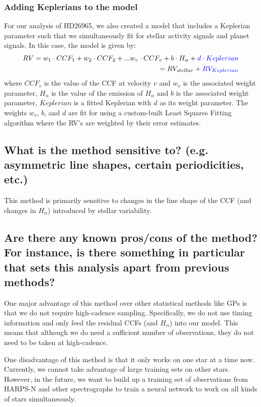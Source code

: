 \documentclass[12pt]{article}
\begin{document}
\subsubsection{Adding Keplerians to the model}
For our analysis of HD26965, we also created a model that includes a Keplerian parameter such that we simultaneously fit for stellar activity signals and planet signals. In this case, the model is given by:
\begin{equation}
\begin{split}
    RV = w_1\cdot CCF_1 +  w_2\cdot CCF_2 + ...  w_v\cdot CCF_v  + b\cdot H_{\alpha} + \textcolor{blue}{d\cdot Keplerian} \\
= RV_{stellar} + \textcolor{blue}{RV_{Keplerian}}
\end{split}
\end{equation}
where $CCF_v$ is the value of the CCF at velocity $v$ and $w_v$ is the associated weight parameter, $H_{\alpha}$ is the value of the emission of $H_{\alpha}$ and $b$ is the associated weight parameter, $Keplerian$ is a fitted Keplerian with $d$ as its weight parameter. The weights $w_v$, $b$, and $d$ are fit for using a custom-built Least Squares Fitting algorithm where the RV's are weighted by their error estimates.


\subsection{What is the method sensitive to? (e.g. asymmetric line shapes, certain periodicities, etc.)} This method is primarily sensitive to changes in the line shape of the CCF (and changes in $H_{\alpha}$) introduced by stellar variability. 

\subsection{Are there any known pros/cons of the method?  For instance, is there something in particular that sets this analysis apart from previous methods?}

One major advantage of this method over other statistical methods like GPs is that we do not require high-cadence sampling. Specifically, we do not use timing information and only feed the residual CCFs (and $H_\alpha$) into our model. This means that although we do need a sufficient number of observations, they do not need to be taken at high-cadence. 

One disadvantage of this method is that it only works on one star at a time now. Currently, we cannot take advantage of large training sets on other stars. However, in the future, we want to build up a training set of observations from HARPS-N and other spectrographs to train a neural network to work on all kinds of stars simultaneously.
\end{document}
